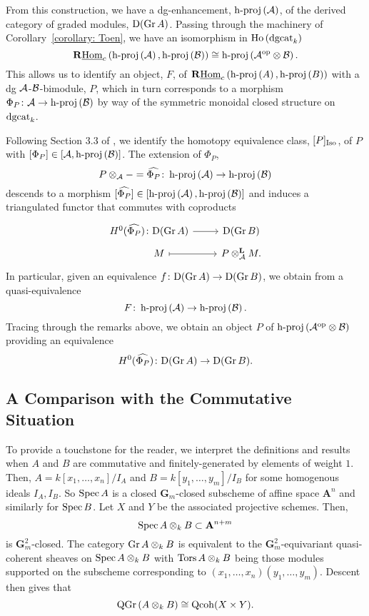 \documentclass[dissertation.tex]{subfiles}
\begin{document}
From this construction, we have a dg-enhancement, \(\operatorname{h-proj}\left(\mathcal{A}\right)\), of the derived category of graded modules, \(\mathrm{D}(\operatorname{Gr}A)\).
Passing through the machinery of Corollary~\ref{corollary: Toen}, we have an isomorphism in \(\operatorname{Ho}\left(\operatorname{dgcat}_k\right)\)
\[\mathbf{R}\underline{\operatorname{Hom}}_c\left(\operatorname{h-proj}\left(\mathcal{A}\right), \operatorname{h-proj}\left(\mathcal{B}\right)\right) \cong \operatorname{h-proj}\left(\mathcal{A}^{\operatorname{op}} \otimes \mathcal{B}\right).\]
This allows us to identify an object, \(F\), of \(\mathbf{R}\underline{\operatorname{Hom}}_c\left(\operatorname{h-proj}\left(A\right), \operatorname{h-proj}\left(B\right)\right)\) with a dg \(\mathcal{A}\)-\(\mathcal{B}\)-bimodule, \(P\), which in turn corresponds to a morphism \(\Phi_P \colon \mathcal{A} \to \operatorname{h-proj}\left(\mathcal{B}\right)\) by way of the symmetric monoidal closed structure on \(\operatorname{dgcat}_k\).

Following Section 3.3 of \cite{CS}, we identify the homotopy equivalence class, \([P]_{\operatorname{Iso}}\), of \(P\) with \([\Phi_P] \in [\mathcal{A}, \operatorname{h-proj}\left(\mathcal{B}\right)]\).
The extension of \(\Phi_P\),
\[P \otimes_{\mathcal{A}} - = \widehat{\Phi_P} \colon \operatorname{h-proj}\left(\mathcal{A}\right) \to \operatorname{h-proj}\left(\mathcal{B}\right)\]
descends to a morphism \([\widehat{\Phi_P}] \in [\operatorname{h-proj}\left(\mathcal{A}\right), \operatorname{h-proj}\left(\mathcal{B}\right)]\)
and induces a triangulated functor that commutes with coproducts
\[\begin{tikzcd}[row sep=tiny]
H^0(\widehat{\Phi_P}) \colon \mathrm{D}(\Gr{A}) \arrow{r} & \mathrm{D}(\Gr{B})\\
\quad\quad M \arrow[mapsto]{r} & P \otimes_\A^\mathbf{L} M.
\end{tikzcd}\]
In particular, given an equivalence \(f \colon \mathrm{D}(\operatorname{Gr}A) \to \mathrm{D}(\operatorname{Gr}B)\), we obtain from \cite{Lunts-Orlov} a quasi-equivalence
\[F \colon \operatorname{h-proj}\left(\mathcal{A}\right) \to \operatorname{h-proj}\left(\mathcal{B}\right).\]
Tracing through the remarks above, we obtain an object \(P\) of \(\operatorname{h-proj}\left(\mathcal{A}^{\operatorname{op}} \otimes \mathcal{B}\right)\) providing an equivalence
\[H^0(\widehat{\Phi_P}) \colon \mathrm{D}(\operatorname{Gr}A) \to \mathrm{D}(\operatorname{Gr}B).\]

\subsection{A Comparison with the Commutative Situation}

To provide a touchstone for the reader, we interpret the definitions and results when \(A\) and \(B\) are commutative and finitely-generated by elements of weight \(1\). Then, \(A = k[x_1,\ldots,x_n]/I_A\) and \(B = k[y_1,\ldots,y_m]/I_B\) for some homogenous ideals \(I_A,I_B\). So \(\operatorname{Spec} A\) is a closed \(\mathbf{G}_m\)-closed subscheme of affine space \(\mathbf{A}^n\) and similarly for \(\operatorname{Spec} B\). Let \(X\) and \(Y\) be the associated projective schemes. Then, 
\begin{displaymath}
  \operatorname{Spec} A \otimes_k B \subset \mathbf{A}^{n+m}
\end{displaymath}
is \(\mathbf{G}_m^2\)-closed. The category \(\operatorname{Gr}A \otimes_k B\) is equivalent to the \(\mathbf{G}_m^2\)-equivariant quasi-coherent sheaves on \(\operatorname{Spec} A \otimes_k B\) with \(\operatorname{Tors}A \otimes_k B\) being those modules supported on the subscheme corresponding to \((x_1,\ldots,x_n)(y_1,\ldots,y_m)\). Descent then gives that 
\begin{displaymath}
  \operatorname{QGr}\left(A \otimes_k B\right) \cong \operatorname{Qcoh}(X \times Y). 
\end{displaymath}
\end{document}
